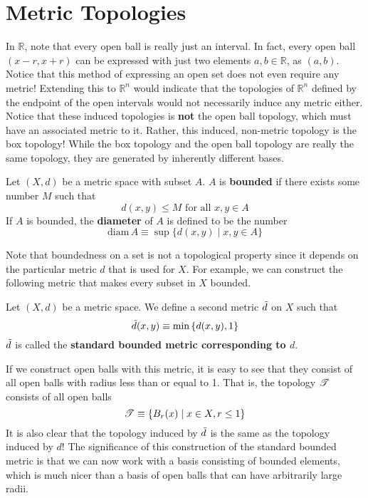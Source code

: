 \section{Metric Topologies}

  In $\mathbb{R}$, note that every open ball is really just an interval. In fact, every open ball $(x - r, x + r)$ can be expressed with just two elements $a, b \in \mathbb{R}$, as $(a, b)$. Notice that this method of expressing an open set does not even require any metric! Extending this to $\mathbb{R}^n$ would indicate that the topologies of $\mathbb{R}^n$ defined by the endpoint of the open intervals would not necessarily induce any metric either. Notice that these induced topologies is \textbf{not} the open ball topology, which must have an associated metric to it. Rather, this induced, non-metric topology is the box topology! While the box topology and the open ball topology are really the same topology, they are generated by inherently different bases. 

  \begin{definition}
    Let $(X, d)$ be a metric space with subset $A$. $A$ is \textbf{bounded} if there exists some number $M$ such that
    \begin{equation}
      d (x, y) \leq M \text{ for all } x,y \in A
    \end{equation}
    If $A$ is bounded, the \textbf{diameter} of $A$ is defined to be the number
    \begin{equation}
      \text{diam}\, A \equiv \sup{\{d(x, y) \mid x, y \in A\}}
    \end{equation}
  \end{definition}

  Note that boundedness on a set is not a topological property since it depends on the particular metric $d$ that is used for $X$. For example, we can construct the following metric that makes every subset in $X$ bounded. 

  \begin{definition}
    Let $(X, d)$ be a metric space. We define a second metric $\Tilde{d}$ on $X$ such that
    \begin{equation}
      \Tilde{d} (x, y) \equiv \min{\{d(x, y), 1\}}
    \end{equation}
    $\Tilde{d}$ is called the \textbf{standard bounded metric corresponding to $d$}. 
  \end{definition}

  If we construct open balls with this metric, it is easy to see that they consist of all open balls with radius less than or equal to 1. That is, the topology $\operatorname{\mathscr{T}}$ consists of all open balls
  \begin{equation}
    \operatorname{\mathscr{T}} \equiv \{B_r (x) \mid x \in X, r \leq 1\}
  \end{equation}
  It is also clear that the topology induced by $\Tilde{d}$ is the same as the topology induced by $d$! The significance of this construction of the standard bounded metric is that we can now work with a basis consisting of bounded elements, which is much nicer than a basis of open balls that can have arbitrarily large radii.  

